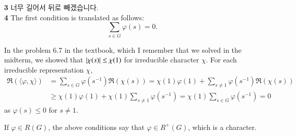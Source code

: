 \documentclass[a4paper, 12pt]{article}
\theoremstyle{Mydefinition}
\theoremstyle{Mytheorem}
\begin{document}
\noindent \textbf{3}
너무 길어서 뒤로 빼겠습니다.\\

\noindent \textbf{4}
The first condition is translated as follows:
\begin{equation}
    \sum_{s\in G}\varphi(s) = 0.
\end{equation}

In the problem 6.7 in the textbook, which I remember that we solved in the midterm, we showed that $\abs{\chi(s)}\leq \chi(1)$ for irreducible character $\chi$. For each irreducible representation $\chi$,
\begin{equation}
\begin{split}
    \Re\left(\langle \varphi, \chi\rangle\right) &= \sum_{s\in G}\varphi(s^{-1})\Re\left(\chi(s)\right)=\chi(1)\varphi(1)+\sum_{s\neq 1}\varphi(s^{-1})\Re(\chi(s))\\
    &\geq \chi(1)\varphi(1)+\chi(1)\sum_{s\neq 1}\varphi(s^{-1})=\chi(1)\sum_{s\in G}\varphi(s^{-1}) = 0
\end{split}
\end{equation}
as $\varphi(s)\leq 0$ for $s\neq 1$.

If $\varphi\in R(G)$, the above conditions say that $\varphi\in R^+(G)$, which is a character.\\
\end{document}
